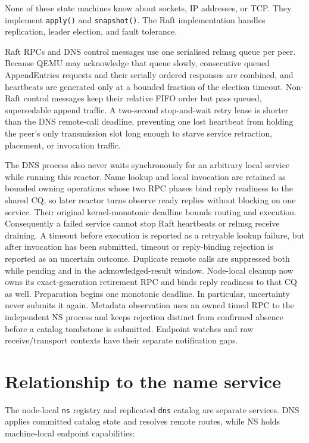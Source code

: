 None of these state machines know about sockets, IP addresses, or TCP. They
implement \texttt{apply()} and \texttt{snapshot()}. The Raft implementation handles
replication, leader election, and fault tolerance.

Raft RPCs and DNS control messages use one serialised relmsg queue per peer.
Because QEMU may acknowledge that queue slowly, consecutive queued
AppendEntries requests and their serially ordered responses are combined, and
heartbeats are generated only at a bounded fraction of the election timeout.
Non-Raft control messages keep their relative FIFO order but pass queued,
supersedable append traffic. A two-second stop-and-wait retry lease is shorter
than the DNS remote-call deadline, preventing one lost heartbeat from holding
the peer's only transmission slot long enough to starve service retraction,
placement, or invocation traffic.

The DNS process also never waits synchronously for an arbitrary local service
while running this reactor. Name lookup and local invocation are retained as
bounded owning operations whose two RPC phases bind reply readiness to the
shared CQ, so later reactor turns observe ready replies without blocking on one
service. Their original kernel-monotonic deadline bounds routing and execution. Consequently a failed
service cannot stop Raft heartbeats or relmsg receive draining. A timeout before
execution is reported as a retryable lookup failure, but after invocation has been
submitted, timeout or reply-binding rejection is reported as an uncertain outcome. Duplicate remote calls are
suppressed both while pending and in the acknowledged-result window.
Node-local cleanup now owns its exact-generation retirement RPC and binds reply
readiness to that CQ as well. Preparation begins one monotonic deadline. In particular,
uncertainty never submits it again. Metadata observation uses an owned timed RPC
to the independent NS process and keeps rejection distinct from confirmed
absence before a catalog tombstone is submitted. Endpoint watches and raw
receive/transport contexts have their separate notification gaps.

\section{Relationship to the name service}

The node-local \texttt{ns} registry and replicated \texttt{dns} catalog are
separate services. DNS applies committed catalog state and resolves remote routes, while
NS holds machine-local endpoint capabilities:

